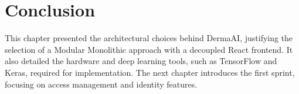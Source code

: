 \section{Conclusion}
This chapter presented the architectural choices behind DermaAI, justifying the selection of a Modular Monolithic approach with a decoupled React frontend. It also detailed the hardware and deep learning tools, such as TensorFlow and Keras, required for implementation. The next chapter introduces the first sprint, focusing on access management and identity features.

